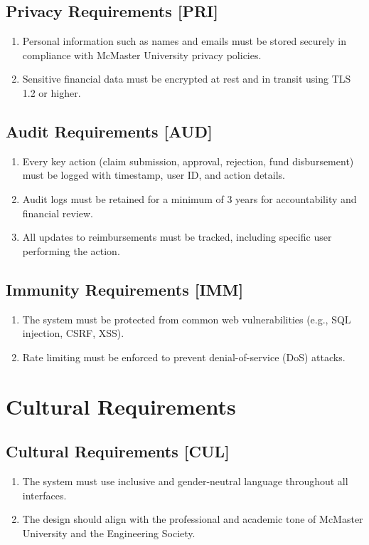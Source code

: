 \documentclass[12pt]{article}
\begin{document}
\subsection{Privacy Requirements [PRI]}
\begin{enumerate}
    \item Personal information such as names and emails must be stored securely in compliance with McMaster University privacy policies.
    \item Sensitive financial data must be encrypted at rest and in transit using TLS 1.2 or higher.
\end{enumerate}

\subsection{Audit Requirements [AUD]}
\begin{enumerate}
    \item Every key action (claim submission, approval, rejection, fund disbursement) must be logged with timestamp, user ID, and action details.
    \item Audit logs must be retained for a minimum of 3 years for accountability and financial review.
    \item All updates to reimbursements must be tracked, including specific user performing the action.
\end{enumerate}

\subsection{Immunity Requirements [IMM]}
\begin{enumerate}
    \item The system must be protected from common web vulnerabilities (e.g., SQL injection, CSRF, XSS).
    \item Rate limiting must be enforced to prevent denial-of-service (DoS) attacks.
\end{enumerate}

\section{Cultural Requirements}

\subsection{Cultural Requirements [CUL]}
\begin{enumerate}
    \item The system must use inclusive and gender-neutral language throughout all interfaces.
    \item The design should align with the professional and academic tone of McMaster University and the Engineering Society.
\end{enumerate}
\end{document}
